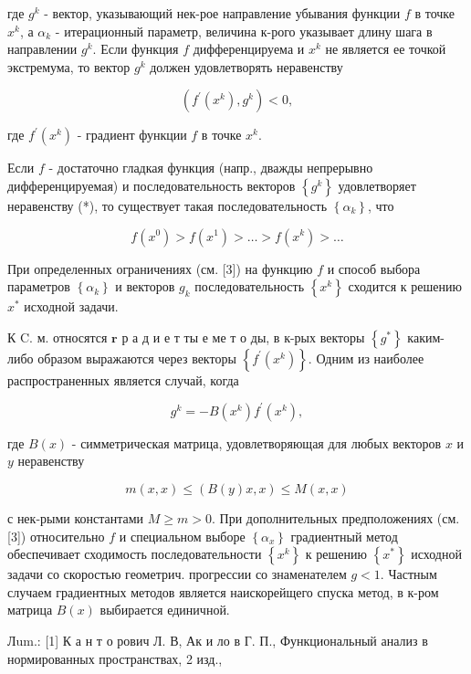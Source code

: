 \documentclass[10pt]{article}
\begin{document}
где $g^{k}$ - вектор, указывающий нек-рое направление убывания функции $f$ в точке $x^{k}$, а $\alpha_{k}$ - итерационный параметр, величина к-рого указывает длину шага в направлении $g^{k}$. Если функция $f$ дифференцируема и $x^{k}$ не является ее точкой экстремума, то вектор $g^{k}$ должен удовлетворять неравенству



\[

\left(f^{\prime}\left(x^{k}\right), g^{k}\right)<0,

\]



где $f^{\prime}\left(x^{k}\right)$ - градиент функции $f$ в точке $x^{k}$.



Если $f$ - достаточно гладкая функция (напр., дважды непрерывно дифференцируемая) и последовательность векторов $\left\{g^{k}\right\}$ удовлетворяет неравенству (*), то существует такая последовательность $\left\{\alpha_{k}\right\}$, что



\[

f\left(x^{0}\right)>f\left(x^{1}\right)>\ldots>f\left(x^{k}\right)>\ldots

\]



При определенных ограничениях (см. [3]) на функцию $f$ и способ выбора параметров $\left\{\alpha_{k}\right\}$ и векторов $g_{k}$ последовательность $\left\{x^{k}\right\}$ сходится к решению $x^{*}$ исходной задачи.



К C. м. относятся $\boldsymbol{r}$ р а д и е т ты е ме т о ды, в к-рых векторы $\left\{g^{*}\right\}$ каким-либо образом выражаются через векторы $\left\{f^{\prime}\left(x^{k}\right)\right\}$. Одним из наиболее распространенных является случай, когда



\[

g^{k}=-B\left(x^{k}\right) f^{\prime}\left(x^{k}\right),

\]



где $B(x)$ - симметрическая матрица, удовлетворяющая для любых векторов $x$ и $y$ неравенству



\[

m(x, x) \leqslant(B(y) x, x) \leqslant M(x, x)

\]



с нек-рыми константами $M \geqslant m>0$. При дополнительных предположениях (см. [3]) относительно $f$ и специальном выборе $\left\{\alpha_{x}\right\}$ градиентный метод обеспечивает сходимость последовательности $\left\{x^{k}\right\}$ к решению $\left\{x^{*}\right\}$ исходной задачи со скоростью геометрич. прогрессии со знаменателем $g<1$. Частным случаем градиентных методов является наискорейщего спуска метод, в к-ром матрица $B(x)$ выбирается единичной.



Лum.: [1] К а н т о рович Л. В, Ак и ло в Г. П., Функциональный анализ в нормированных пространствах, 2 изд.,
\end{document}
